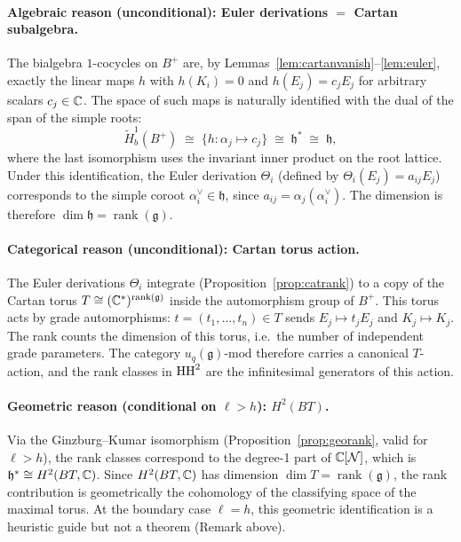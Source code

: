 \paragraph{Algebraic reason (unconditional): Euler derivations $=$ Cartan subalgebra.}
The bialgebra $1$-cocycles on $B^+$ are, by Lemmas~\ref{lem:cartanvanish}--\ref{lem:euler}, exactly the linear maps $h$ with $h(K_i) = 0$ and $h(E_j) = c_j E_j$ for arbitrary scalars $c_j \in \mathbb{C}$. The space of such maps is naturally identified with the dual of the span of the simple roots:
\[
\tilde{H}^1_b(B^+) \;\cong\; \{h : \alpha_j \mapsto c_j\} \;\cong\; \mathfrak{h}^* \;\cong\; \mathfrak{h},
\]
where the last isomorphism uses the invariant inner product on the root lattice. Under this identification, the Euler derivation $\Theta_i$ (defined by $\Theta_i(E_j) = a_{ij} E_j$) corresponds to the simple coroot $\alpha_i^\vee \in \mathfrak{h}$, since $a_{ij} = \alpha_j(\alpha_i^\vee)$. The dimension is therefore $\dim \mathfrak{h} = \operatorname{rank}(\mathfrak{g})$.

\paragraph{Categorical reason (unconditional): Cartan torus action.}
The Euler derivations $\Theta_i$ integrate (Proposition~\ref{prop:catrank}) to a copy of the Cartan torus $T \cong (\mathbb{C}^*)^{\operatorname{rank}(\mathfrak{g})}$ inside the automorphism group of $B^+$. This torus acts by grade automorphisms: $t = (t_1, \ldots, t_n) \in T$ sends $E_j \mapsto t_j E_j$ and $K_j \mapsto K_j$. The rank counts the dimension of this torus, i.e.\ the number of independent grade parameters. The category $u_q(\mathfrak{g})\text{-mod}$ therefore carries a canonical $T$-action, and the rank classes in $\operatorname{HH}^2$ are the infinitesimal generators of this action.

\paragraph{Geometric reason (conditional on $\ell > h$): $H^2(BT)$.}
Via the Ginzburg--Kumar isomorphism (Proposition~\ref{prop:georank}, valid for $\ell > h$), the rank classes correspond to the degree-1 part of $\mathbb{C}[\mathcal{N}]$, which is $\mathfrak{h}^* \cong H^2(BT, \mathbb{C})$. Since $H^2(BT, \mathbb{C})$ has dimension $\dim T = \operatorname{rank}(\mathfrak{g})$, the rank contribution is geometrically the cohomology of the classifying space of the maximal torus. At the boundary case $\ell = h$, this geometric identification is a heuristic guide but not a theorem (Remark above).

